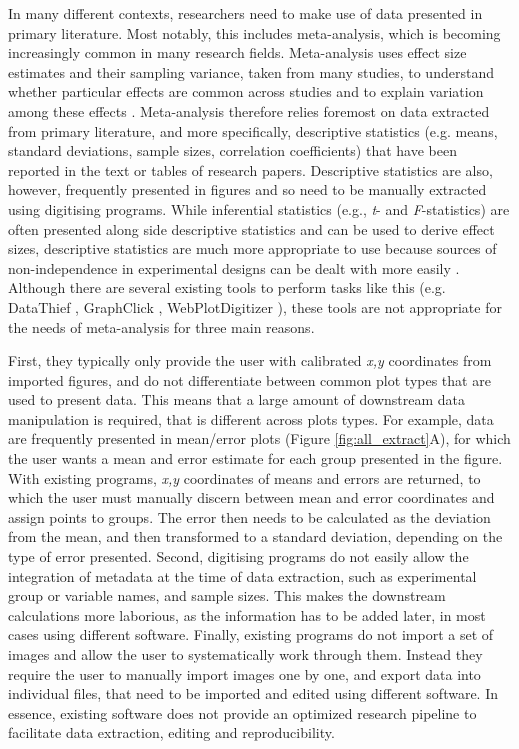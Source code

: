 \documentclass[12pt]{article}
\let\proglang=\textsf
\begin{document}
In many different contexts, researchers need to make use of data presented in primary literature. Most notably, this includes meta-analysis, which is becoming increasingly common in many research fields. Meta-analysis uses effect size estimates and their sampling variance, taken from many studies, to understand whether particular effects are common across studies and to explain variation among these effects \citep{Glass1976,Borenstein2009,Koricheva2013,Naka2017}. Meta-analysis therefore relies foremost on data extracted from primary literature, and more specifically, descriptive statistics (e.g. means, standard deviations, sample sizes, correlation coefficients) that have been reported in the text or tables of research papers. Descriptive statistics are also, however, frequently presented in figures and so need to be manually extracted using digitising programs. While inferential statistics (e.g., \textit{t}- and \textit{F}-statistics) are often presented along side descriptive statistics and can be used to derive effect sizes, descriptive statistics are much more appropriate to use because sources of non-independence in experimental designs can be dealt with more easily \citep{Noble2017}. Although there are several existing tools to perform tasks like this (e.g. \proglang{DataThief} \citep{DataThief}, \proglang{GraphClick} \citep{GraphClick}, \proglang{WebPlotDigitizer} \citep{WebPlotDigitizer}), these tools are not appropriate for the needs of meta-analysis for three main reasons. 

First, they typically only provide the user with calibrated \textit{x,y} coordinates from imported figures, and do not differentiate between common plot types that are used to present data. This means that a large amount of downstream data manipulation is required, that is different across plots types. For example, data are frequently presented in mean/error plots (Figure \ref{fig:all_extract}A), for which the user wants a mean and error estimate for each group presented in the figure. With existing programs, \textit{x,y} coordinates of means and errors are returned, to which the user must manually discern between mean and error coordinates and assign points to groups. The error then needs to be calculated as the deviation from the mean, and then transformed to a standard deviation, depending on the type of error presented. Second, digitising programs do not easily allow the integration of metadata at the time of data extraction, such as experimental group or variable names, and sample sizes. This makes the downstream calculations more laborious, as the information has to be added later, in most cases using different software. Finally, existing programs do not import a set of images and allow the user to systematically work through them. Instead they require the user to manually import images one by one, and export data into individual files, that need to be imported and edited using different software. In essence, existing software does not provide an optimized research pipeline to facilitate data extraction, editing and reproducibility. 
\end{document}
